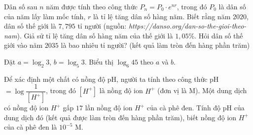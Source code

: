 \begin{ex}%
Dân số sau $n$ năm được tính theo công thức $P_n=P_0 \cdot e^{nr}$, trong đó $P_0$ là dân số của năm lấy làm mốc tính, $r$ là tỉ lệ tăng dân số hàng năm. Biết rằng năm $2020$, dân số thế giới là $7{,}795$ tỉ người (nguồn: \textit{https://danso.org/dan-so-the-gioi-theo-nam}). Giả sử tỉ lệ tăng dân số hàng năm của thế giới là $1{,}05\%$. Hỏi dân số thế giới vào năm $2035$ là bao nhiêu tỉ người? (kết quả làm tròn đến hàng phần trăm)
\end{ex}

\begin{ex}%
Đặt $a=\log_2 3$, $b=\log_5 3$. Biểu thị $\log_6{45}$ theo $a$ và $b$.
\end{ex}

\begin{ex}%
	Để xác định một chất có nồng độ pH, người ta tính theo công thức pH$=\log\dfrac{1}{\left[H^+\right]}$, trong đó $\left[H^+\right]$ là nồng độ ion $H^+$ (đơn vị là M). Một dung dịch có nồng độ ion $H^+$ gấp $17$ lần nồng độ ion $H^+$ của cà phê đen. Tính độ pH của dung dịch đó (kết quả được làm tròn đến hàng phần trăm), biết nồng độ ion $H^+$ của cà phê đen là $10^{-5}$ M.
\end{ex}

